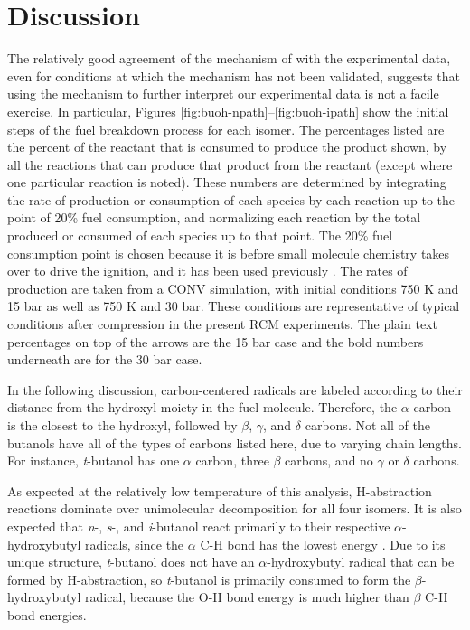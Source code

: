 \documentclass[12pt, letterpaper]{article}
\begin{document}
\section{Discussion}
\label{sec:buoh-discussion}

The relatively good agreement of the mechanism of \textcite{Sarathy2012} with
the experimental data, even for conditions at which the mechanism has not been
validated, suggests that using the mechanism to further interpret our
experimental data is not a facile exercise. In particular, Figures
\ref{fig:buoh-npath}--\ref{fig:buoh-ipath} show the initial steps of the fuel
breakdown process for each isomer. The percentages listed are the percent of
the reactant that is consumed to produce the product shown, by all the
reactions that can produce that product from the reactant (except where one
particular reaction is noted). These numbers are determined by integrating the
rate of production or consumption of each species by each reaction up to the
point of 20\% fuel consumption, and normalizing each reaction by the total
produced or consumed of each species up to that point. The 20\% fuel
consumption point is chosen because it is before small molecule chemistry takes
over to drive the ignition, and it has been used previously
\cite{Weber2011,Sarathy2012}. The rates of production are taken from a CONV
simulation, with initial conditions 750 K and 15 bar as well as 750 K and 30
bar. These conditions are representative of typical conditions after compression
in the present RCM experiments. The plain text percentages on top of the arrows
are the 15 bar case and the bold numbers underneath are for the 30 bar case.

In the following discussion, carbon-centered radicals are labeled according to
their distance from the hydroxyl moiety in the fuel molecule. Therefore, the
$\alpha$ carbon is the closest to the hydroxyl, followed by $\beta$, $\gamma$,
and $\delta$ carbons. Not all of the butanols have all of the types of carbons
listed here, due to varying chain lengths. For instance, \textit{t}-butanol has
one $\alpha$ carbon, three $\beta$ carbons, and no $\gamma$ or $\delta$ carbons.

As expected at the relatively low temperature of this analysis, H-abstraction
reactions dominate over unimolecular decomposition for all four isomers. It is
also expected that \textit{n}-, \textit{s}-, and \textit{i}-butanol react
primarily to their respective $\alpha$-hydroxybutyl radicals, since the
$\alpha$ C-H bond has the lowest energy \cite{Sarathy2012}. Due to its unique
structure, \textit{t}-butanol does not have an $\alpha$-hydroxybutyl radical
that can be formed by H-abstraction, so \textit{t}-butanol is primarily
consumed to form the $\beta$-hydroxybutyl radical, because the O-H bond energy
is much higher than $\beta$ C-H bond energies.
\end{document}
